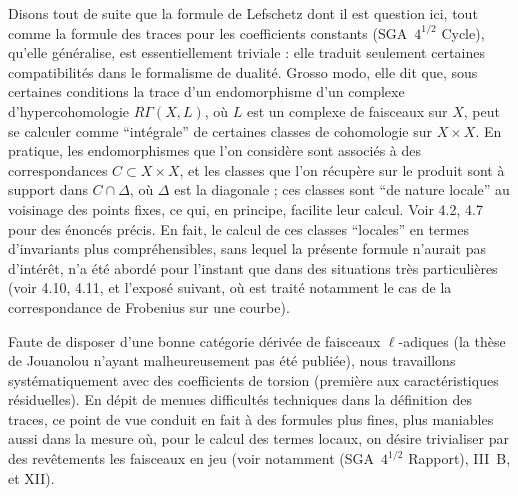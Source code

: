 Disons tout de suite que la formule de Lefschetz dont il est question ici, tout comme la formule des traces pour les coefficients constants (SGA~$4^{1/2}$ Cycle), qu'elle généralise, est essentiellement triviale : elle traduit seulement certaines compatibilités dans le formalisme de dualité. Grosso modo, elle dit que, sous certaines conditions la trace d'un endomorphisme d'un complexe d'hypercohomologie $R\Gamma(X,L)$, où $L$ est un complexe de faisceaux sur $X$, peut se calculer comme ``intégrale'' de certaines classes de cohomologie sur $X \times X$. En pratique, les endomorphismes que l'on considère sont associés à des correspondances $C \subset X \times X$, et les classes que l'on récupère sur le produit sont à support dans $C \cap \Delta$, où $\Delta$ est la diagonale ; ces classes sont ``de nature locale'' au voisinage des points fixes, ce qui, en principe, facilite leur calcul. Voir 4.2, 4.7 pour des énoncés précis. En fait, le calcul de ces classes ``locales'' en termes d'invariants plus compréhensibles, sans lequel la présente formule n'aurait pas d'intérêt, n'a été abordé pour l'instant que dans des situations très particulières (voir 4.10, 4.11, et l'exposé suivant, où est traité notamment le cas de la correspondance de Frobenius sur une courbe).

Faute de disposer d'une bonne catégorie dérivée de faisceaux $\ell$-adiques 
(la thèse de
Jouanolou n'ayant malheureusement pas été publiée), nous travaillons systématiquement avec des coefficients de torsion (première aux caractéristiques résiduelles). En dépit de menues difficultés techniques dans la définition des traces, ce point de vue conduit en fait à des formules plus fines, plus maniables aussi dans la mesure où, pour le calcul des termes locaux, on désire trivialiser par des revêtements les faisceaux en jeu (voir notamment (SGA~$4^{1/2}$ Rapport), III~B, et XII).

